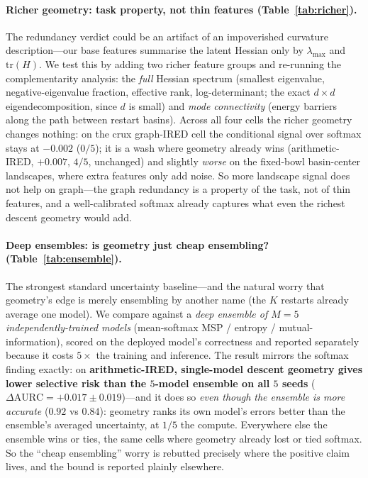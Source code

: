 \paragraph{Richer geometry: task property, not thin features (Table~\ref{tab:richer}).} The
redundancy verdict could be an artifact of an impoverished curvature description---our base features
summarise the latent Hessian only by $\lambda_{\max}$ and $\mathrm{tr}(H)$. We test this by adding two
richer feature groups and re-running the complementarity analysis: the \emph{full} Hessian spectrum
(smallest eigenvalue, negative-eigenvalue fraction, effective rank, log-determinant; the exact
$d\times d$ eigendecomposition, since $d$ is small) and \emph{mode connectivity} (energy barriers
along the path between restart basins). Across all four cells the richer geometry changes nothing: on
the crux graph-IRED cell the conditional signal over softmax stays at $-0.002$ ($0/5$); it is a wash
where geometry already wins (arithmetic-IRED, $+0.007$, $4/5$, unchanged) and slightly \emph{worse} on
the fixed-bowl basin-center landscapes, where extra features only add noise. So more landscape signal
does not help on graph---the graph redundancy is a property of the task, not of thin features, and a
well-calibrated softmax already captures what even the richest descent geometry would add.

\paragraph{Deep ensembles: is geometry just cheap ensembling? (Table~\ref{tab:ensemble}).} The
strongest standard uncertainty baseline---and the natural worry that geometry's edge is merely
ensembling by another name (the $K$ restarts already average one model). We compare against a
\emph{deep ensemble of $M{=}5$ independently-trained models} (mean-softmax MSP / entropy /
mutual-information), scored on the deployed model's correctness and reported separately because it
costs $5\times$ the training and inference. The result mirrors the softmax finding exactly: on
\textbf{arithmetic-IRED, single-model descent geometry gives lower selective risk than the $5$-model
ensemble on all $5$ seeds} ($\Delta\mathrm{AURC}=+0.017\pm0.019$)---and it does so \emph{even though
the ensemble is more accurate} ($0.92$ vs $0.84$): geometry ranks its own model's errors better than
the ensemble's averaged uncertainty, at $1/5$ the compute. Everywhere else the ensemble wins or ties,
the same cells where geometry already lost or tied softmax. So the ``cheap ensembling'' worry is
rebutted precisely where the positive claim lives, and the bound is reported plainly elsewhere.

